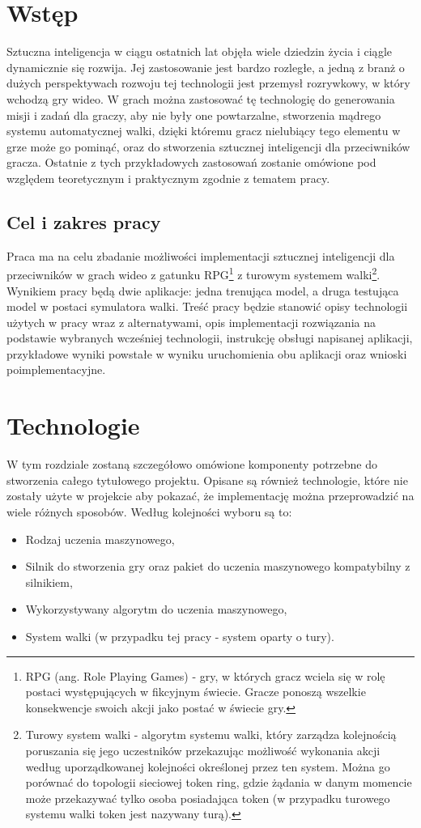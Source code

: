 \documentclass{SGGW-thesis}
\begin{document}
\chapter{Wstęp}
Sztuczna inteligencja w ciągu ostatnich lat objęła wiele dziedzin życia i ciągle dynamicznie się rozwija. 
Jej zastosowanie jest bardzo rozległe, a jedną z branż o dużych perspektywach rozwoju tej technologii jest przemysł rozrywkowy, 
w który wchodzą gry wideo. W grach można zastosować tę technologię do generowania misji i zadań dla graczy, aby nie były one powtarzalne, 
stworzenia mądrego systemu automatycznej walki, dzięki któremu gracz nielubiący tego elementu w grze może go pominąć, oraz do stworzenia 
sztucznej inteligencji dla przeciwników gracza. Ostatnie z tych przykładowych zastosowań zostanie omówione pod względem teoretycznym i praktycznym 
zgodnie z tematem pracy.

\section{Cel i zakres pracy}
Praca ma na celu zbadanie możliwości implementacji sztucznej inteligencji dla przeciwników w grach wideo z gatunku RPG\footnote{RPG (ang. Role Playing Games)
- gry, w których gracz wciela się w rolę postaci występujących w fikcyjnym świecie. Gracze ponoszą wszelkie konsekwencje swoich akcji jako postać w świecie gry.}
z turowym systemem walki\footnote{Turowy system walki - algorytm systemu walki, który zarządza kolejnością poruszania się jego uczestników przekazując możliwość wykonania akcji według uporządkowanej kolejności określonej przez ten system. Można go porównać do topologii sieciowej token ring, gdzie żądania w danym momencie może przekazywać tylko osoba posiadająca token (w przypadku turowego systemu walki token jest nazywany turą).}. 
Wynikiem pracy będą dwie aplikacje: jedna trenująca model, a druga testująca model w postaci symulatora walki. 
Treść pracy będzie stanowić opisy technologii użytych w pracy wraz z alternatywami, opis implementacji rozwiązania na podstawie wybranych 
wcześniej technologii, instrukcję obsługi napisanej aplikacji, przykładowe wyniki powstałe w wyniku uruchomienia obu aplikacji oraz wnioski poimplementacyjne.

\chapter{Technologie}
W tym rozdziale zostaną szczegółowo omówione komponenty potrzebne do stworzenia całego tytułowego projektu. Opisane są również technologie, które nie zostały użyte w projekcie aby pokazać, że implementację można przeprowadzić na wiele różnych sposobów. Według kolejności wyboru są to: 
\begin{itemize}
  \item{Rodzaj uczenia maszynowego},
  \item{Silnik do stworzenia gry oraz pakiet do uczenia maszynowego kompatybilny z silnikiem},
  \item{Wykorzystywany algorytm do uczenia maszynowego},
  \item{System walki (w przypadku tej pracy - system oparty o tury)}.
\end{itemize}
\end{document}
